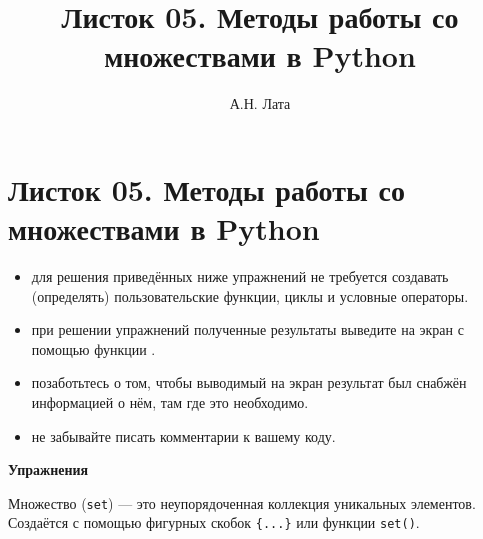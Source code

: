 \documentclass[a4,12pt]{article}
\title{Листок 05. Методы работы со множествами в Python}
\author{А.Н. Лата}
\theoremstyle{remark}
\begin{document}

\section*{\centering Листок 05. Методы работы со множествами в Python}

\begin{exercisenote}[title=Замечания]
\begin{itemize}
    \item для решения приведённых ниже упражнений не требуется создавать (определять) пользовательские функции, циклы и условные операторы.
    \item при решении упражнений полученные результаты выведите на экран с помощью функции {\color{blue}{print()}}.
    \item позаботьтесь о том, чтобы выводимый на экран результат был снабжён информацией о нём, там где это необходимо.
    \item не забывайте писать комментарии к вашему коду.
\end{itemize}
\end{exercisenote}

\textbf{Упражнения}

\begin{exercisecomment}[title=Раздел 1. Создание множеств]
Множество (\texttt{set}) --- это неупорядоченная коллекция уникальных элементов.
Создаётся с помощью фигурных скобок \texttt{\{...\}} или функции \texttt{set()}.
\end{exercisecomment}
\end{document}
